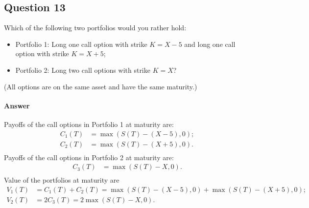 %

\subsection{Question 13}
Which of the following two portfolios would you rather hold:
\begin{itemize}
    \item Portfolio 1: Long one call option with strike $ K = X - 5 $ and long
        one call option with strike $ K = X + 5 $;
    \item Portfolio 2: Long two call options with strike $ K = X $?
\end{itemize}
(All options are on the same asset and have the same maturity.)

\paragraph{Answer}
Payoffs of the call options in Portfolio 1 at maturity are:
\begin{align*}
    C_1(T) &= \max (S(T) - (X - 5), 0); \\
    C_2(T) &= \max (S(T) - (X + 5), 0). \\
\end{align*}
Payoffs of the call options in Portfolio 2 at maturity are:
\begin{align*}
    C_3(T) &= \max (S(T) - X, 0). \\
\end{align*}
Value of the portfolios at maturity are
\begin{align*}
    V_1(T) &= C_1(T) + C_2(T) = \max (S(T) - (X - 5), 0) +
        \max (S(T) - (X + 5), 0); \\
    V_2(T) &= 2 C_3(T) = 2 \max (S(T) - X, 0).
\end{align*}

